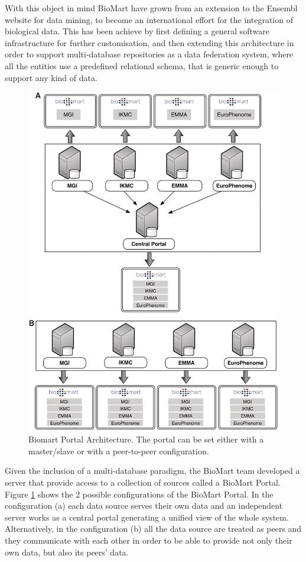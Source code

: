 With this object in mind BioMart have grown from an extension to the Ensembl website for data mining, to become an international effort for the integration of biological data. This has been achieve by first defining a general software infrastructure for further customisation, and then extending this architecture in order to support multi-database repositories as a data federation system, where all the entities use a predefined relational schema, that is generic enough to support any kind of data.

\begin{figure}  
\includegraphics[width=\textwidth]{figures/biomart.png}
\caption[Biomart Portal Architecture.]{Biomart Portal Architecture. The portal can be set either with a master/slave or with a peer-to-peer configuration.
\label{fig:biomart}}
\end{figure}

Given the inclusion of a multi-database paradigm, the BioMart team developed a server that provide access to a collection of sources called a BioMart Portal. Figure \ref{fig:biomart} shows the 2 possible configurations of the BioMart Portal. In the configuration (a) each data source serves their own data and an independent server works as a central portal generating a unified view of the whole system. Alternatively, in the configuration (b) all the data source are treated as peers and they communicate with each other in order to be able to provide not only their own data, but also its peers' data.

